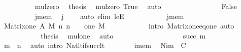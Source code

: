 \begin{isabellebody}
\ \ \ \ \ \ \ \ \isamarkupfalse%
\ mul{\isacharunderscore}{\kern0pt}zero\ \isamarkupfalse%
\ {\isacharquery}{\kern0pt}thesis\ \isamarkupfalse%
\ mul{\isacharunderscore}{\kern0pt}zero\ True\ \isamarkupfalse%
\ auto\isanewline
\ \ \ \ \ \ \isamarkupfalse%
\isanewline
\ \ \ \ \ \ \ \ \isamarkupfalse%
\ False\isanewline
\ \ \ \ \ \ \ \ \isamarkupfalse%
\ j{\isacharunderscore}{\kern0pt}mem\ \isamarkupfalse%
\ {\isachardoublequoteopen}j\ {\isacharequal}{\kern0pt}\ {}{\isachardoublequoteclose}\ \isamarkupfalse%
\ {\isacharparenleft}{\kern0pt}auto\ elim{\isacharcolon}{\kern0pt}\ leE{\isacharparenright}{\kern0pt}\isanewline
\ \ \ \ \ \ \ \ \isamarkupfalse%
\ \isamarkupfalse%
\ j{\isacharunderscore}{\kern0pt}mem\ \isamarkupfalse%
\ {\isachardoublequoteopen}Matrix{\isacharunderscore}{\kern0pt}one\ A\ M\ n\ n\ {\isacharbackquote}{\kern0pt}{}\ {\isacharbackquote}{\kern0pt}{}\ {\isacharequal}{\kern0pt}\ one\ M{\isachardoublequoteclose}\isanewline
\ \ \ \ \ \ \ \ \ \ \isamarkupfalse%
\ {\isacharparenleft}{\kern0pt}intro\ Matrix{\isacharunderscore}{\kern0pt}one{\isacharunderscore}{\kern0pt}eq{\isacharunderscore}{\kern0pt}one{\isacharparenright}{\kern0pt}\ auto\isanewline
\ \ \ \ \ \ \ \ \isamarkupfalse%
\ \isamarkupfalse%
\ {\isacharquery}{\kern0pt}thesis\ \isamarkupfalse%
\ mul{\isacharunderscore}{\kern0pt}one\ \isamarkupfalse%
\ auto\isanewline
\ \ \ \ \ \ \isamarkupfalse%
\isanewline
\ \ \ \ \isamarkupfalse%
\isanewline
\ \ \ \ \ \ \isamarkupfalse%
\ {\isacharparenleft}{\kern0pt}succ\ m{\isacharparenright}{\kern0pt}\isanewline
\ \ \ \ \ \ \isamarkupfalse%
\ \isamarkupfalse%
\ {\isachardoublequoteopen}m\ {\isacharless}{\kern0pt}\ n{\isachardoublequoteclose}\ \isamarkupfalse%
\ {\isacharparenleft}{\kern0pt}auto\ intro{\isacharcolon}{\kern0pt}\ Nat{\isacharunderscore}{\kern0pt}lt{\isacharunderscore}{\kern0pt}if{\isacharunderscore}{\kern0pt}succ{\isacharunderscore}{\kern0pt}lt{\isacharparenright}{\kern0pt}\isanewline
\ \ \ \ \ \ \isamarkupfalse%
\ i{\isacharunderscore}{\kern0pt}mem\ \isamarkupfalse%
\ {\isachardoublequoteopen}N{\isacharbackquote}{\kern0pt}i{\isacharbackquote}{\kern0pt}m\ {\isacharcolon}{\kern0pt}\ C{\isachardoublequoteclose}\ \isamarkupfalse%

\end{isabellebody}
